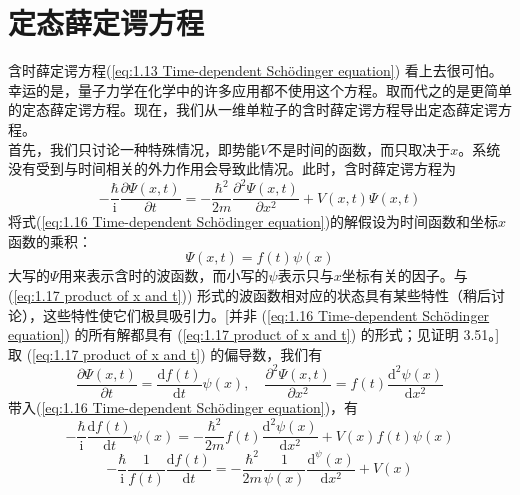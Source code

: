 	\section{定态薛定谔方程}
	含时薛定谔方程(\ref{eq:1.13 Time-dependent Schödinger equation}) 看上去很可怕。幸运的是，量子力学在化学中的许多应用都不使用这个方程。取而代之的是更简单的定态薛定谔方程。现在，我们从一维单粒子的含时薛定谔方程导出定态薛定谔方程。\\
	\indent 首先，我们只讨论一种特殊情况，即势能$V$不是时间的函数，而只取决于$x$。系统没有受到与时间相关的外力作用会导致此情况。此时，含时薛定谔方程为
	\begin{equation}
		-\frac{\hbar}{\mathrm{i}}\frac{\partial \Psi \left(x,t\right)}{\partial t}= -\frac{\hbar^2}{2m}\frac{\partial^2 \Psi \left(x,t\right)}{\partial x^2}+ V\left(x,t\right)\Psi\left(x,t\right)
		\label{eq:1.16 Time-dependent Schödinger equation}
	\end{equation}
	将式(\ref{eq:1.16 Time-dependent Schödinger equation})的解假设为时间函数和坐标$x$函数的乘积：
	\begin{equation}
		\boxed{\Psi\left(x,t\right)=f\left(t\right)\psi\left(x\right)}
		\label{eq:1.17 product of x and t}
	\end{equation}
	大写的$\Psi$用来表示含时的波函数，而小写的$\psi$表示只与$x$坐标有关的因子。与 (\ref{eq:1.17 product of x and t})) 形式的波函数相对应的状态具有某些特性（稍后讨论），这些特性使它们极具吸引力。[并非 (\ref{eq:1.16 Time-dependent Schödinger equation}) 的所有解都具有 (\ref{eq:1.17 product of x and t}) 的形式；见证明 3.51。]取 (\ref{eq:1.17 product of x and t}) 的偏导数，我们有
	\begin{equation*}
		\frac{\partial \Psi\left(x,t\right)}{\partial t} = \frac{\mathrm{d} f\left(t\right)}{\mathrm{d}t} \psi\left(x\right), \quad \frac{\partial^2 \Psi \left(x,t\right)}{\partial x^2}= f\left(t\right) \frac{\mathrm{d}^2\psi\left(x\right)}{\mathrm{d}x^2}
	\end{equation*}
	带入(\ref{eq:1.16 Time-dependent Schödinger equation})，有
	\begin{equation*}
		-\frac{\hbar}{\mathrm{i}}\frac{\mathrm{d}f\left(t\right)}{\mathrm{d}t}\psi\left(x\right)=-\frac{\hbar^2}{2m}f\left(t\right)\frac{\mathrm{d}^2\psi\left(x\right)}{\mathrm{d}x^2}+V\left(x\right)f\left(t\right)\psi\left(x\right)
	\end{equation*}
	\begin{equation}
			-\frac{\hbar}{\mathrm{i}}\frac{1}{f\left(t\right)}\frac{\mathrm{d}f\left(t\right)}{\mathrm{d}t}=-\frac{\hbar^2}{2m}\frac{1}{\psi\left(x\right)}\frac{\mathrm{d}^\psi\left(x\right)}{\mathrm{d}x^2}+V\left(x\right)
			\label{eq:1.18}
	\end{equation}
